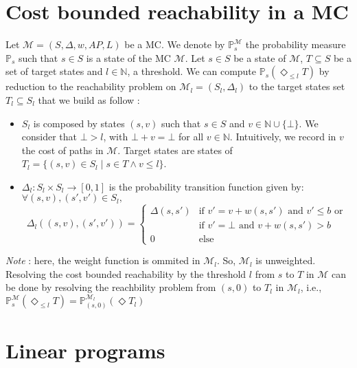 \section{Cost bounded reachability in a MC}

Let $\mathcal{M} = (S, \Delta, w, AP, L)$ be a MC. We denote by $\mathbb{P}^\mathcal{M}_s$ the probability measure $\mathbb{P}_s$ such that $s \in S$ is a state of the MC $\mathcal{M}$.
Let $s \in S$ be a state of $\mathcal{M}$, $T \subseteq S$ be a set of target states and $l \in \mathbb{N}$, a threshold.
We can compute $\mathbb{P}_s(\Diamond_{\leq l} T)$ by reduction to the reachability problem on $\mathcal{M}_l = (S_l, \Delta_l)$ to the target states set $T_l \subseteq S_l$ that we build as follow :
\begin{itemize}
	\item $S_l$ is composed by states $(s, v)$ such that $s \in S $ and $v \in \mathbb{N} \cup \{ \bot \}$. We consider that $\bot > l$, with $\bot + v = \bot$ for all $v \in \mathbb{N}$. Intuitively, we record in $v$ the cost of paths in $\mathcal{M}$. Target states are states of $T_l = \{ (s, v) \in S_l \; | \; s \in T \wedge v \leq l \}$.
	\item $\Delta_l: S_l \times S_l \rightarrow [0,1]$ is the probability transition function given by:\\
	$\forall (s, v), (s', v') \in S_l,$
	\[
		\Delta_l((s, v), (s', v')) =
		\begin{cases}
		\Delta(s, s') & \text{if $v' = v + w(s, s')$ and $v' \leq b$  or} \\
		 & \text{if $v' = \bot$ and $v + w(s, s') > b$} \\
		 0 & \text{else}
		\end{cases}
	\]
\end{itemize}
\textit{Note} : here, the weight function is ommited in $\mathcal{M}_l$. So, $\mathcal{M}_l$ is unweighted. \\
Resolving the cost bounded reachability by the threshold $l$ from $s$ to $T$ in $\mathcal{M}$ can be done by resolving the reachbility problem from $(s, 0)$ to $T_l$ in $\mathcal{M}_l$, i.e., $\mathbb{P}^\mathcal{M}_s(\Diamond_{\leq l} T) = \mathbb{P}^{\mathcal{M}_l}_{(s, 0)}(\Diamond T_l)$

\section{Linear programs}

